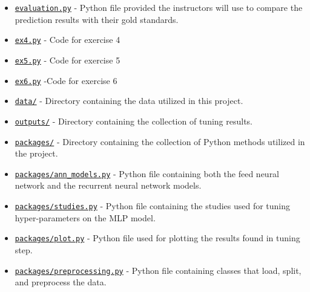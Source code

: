 \begin{itemize}


\item \href{https://github.uio.no/fabior/IN5550/blob/master/Oblig2/evaluation.py}{\texttt{evaluation.py}} - Python file provided the instructors will use to compare the prediction results with their gold standards.


\item \href{https://github.uio.no/fabior/IN5550/tree/master/Oblig2/ex4.py}{\texttt{ex4.py}} - Code for exercise 4

\item \href{https://github.uio.no/fabior/IN5550/tree/master/Oblig2/ex5.py}{\texttt{ex5.py}} - Code for exercise 5

\item \href{https://github.uio.no/fabior/IN5550/tree/master/Oblig2/ex6.py}{\texttt{ex6.py}} -Code for exercise 6

\item \href{https://github.uio.no/fabior/IN5550/tree/master/Oblig2/data}{\texttt{data/}} - Directory containing the data utilized in this project.

\item \href{https://github.uio.no/fabior/IN5550/tree/master/Oblig2/outputs}{\texttt{outputs/}} - Directory containing the collection of tuning results.

\item \href{https://github.uio.no/fabior/IN5550/tree/master/Oblig2/packages}{\texttt{packages/}} - Directory containing the collection of Python methods utilized in the project.

\item \href{https://github.uio.no/fabior/IN5550/tree/master/Oblig2/packages/ann_models.py}{\texttt{packages/ann\_models.py}} - Python file containing both the feed neural network and the recurrent neural network models.

\item \href{https://github.uio.no/fabior/IN5550/tree/master/Oblig2/packages/studies.py}{\texttt{packages/studies.py}} - Python file containing the studies used for tuning hyper-parameters on the MLP model.

\item \href{https://github.uio.no/fabior/IN5550/blob/master/Oblig2/packages/plot.py}{\texttt{packages/plot.py}} - Python file used for plotting the results found in tuning step.

\item \href{https://github.uio.no/fabior/IN5550/tree/master/Oblig2/packages/preprocessing.py}{\texttt{packages/preprocessing.py}} - Python file containing classes that load, split, and preprocess the data.


\end{itemize}
